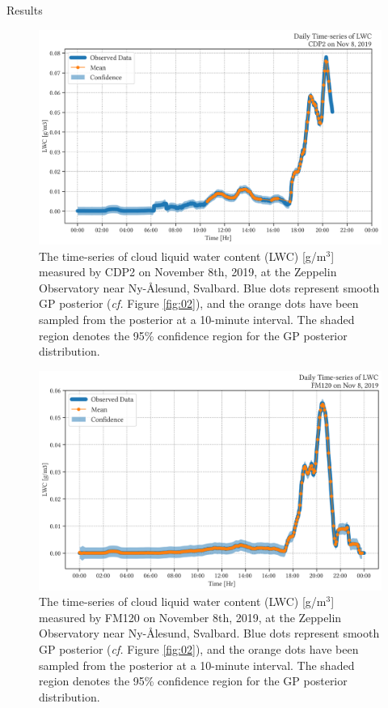 \documentclass[final]{beamer}
\newlength{\colwidth}
\begin{document}
\begin{frame}[t]
\begin{columns}[t]
\begin{column}{\colwidth}
\begin{block}{Results}
    \begin{figure}
        \centering
        \includegraphics[width=\colwidth]{img/lwc_cdp.png}
        \caption{ The time-series of cloud liquid water content (LWC) [g/m$^3$] measured by CDP2 on November 8th, 2019, at the Zeppelin Observatory near Ny-\r{A}lesund, Svalbard. Blue dots represent smooth GP posterior (\emph{cf.} Figure \ref{fig:02}), and the orange dots have been sampled from the posterior at a 10-minute interval. The shaded region denotes the 95\% confidence region for the GP posterior distribution. }
        \label{fig:03}
    \end{figure}

    \begin{figure}
        \centering
        \includegraphics[width=\colwidth]{img/lwc_fm.png}
        \caption{ The time-series of cloud liquid water content (LWC) [g/m$^3$] measured by FM120 \cite{karl2020ro,koik2019ye} on November 8th, 2019, at the Zeppelin Observatory near Ny-\r{A}lesund, Svalbard. Blue dots represent smooth GP posterior (\emph{cf.} Figure \ref{fig:02}), and the orange dots have been sampled from the posterior at a 10-minute interval. The shaded region denotes the 95\% confidence region for the GP posterior distribution. }
        \label{fig:04}
    \end{figure}
  \end{block}


\end{column}
\end{columns}
\end{frame}
\end{document}
